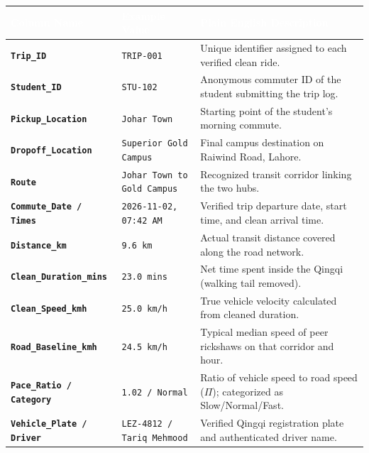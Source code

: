 \documentclass[10pt, a4paper]{article}
\begin{document}
\begin{table}[h!]
\centering
\fontsize{7.8pt}{9.8pt}\selectfont
\begin{tabularx}{\textwidth}{|>{\bfseries\color{navyblue}}p{3.6cm}|p{2.5cm}|X|}
\hline
\rowcolor{navyblue}\textcolor{white}{\textbf{Column Name}} & \textcolor{white}{\textbf{Example Value}} & \textcolor{white}{\textbf{Plain English Description}} \\ \hline
\rowcolor{white}\texttt{Trip\_ID} & \texttt{TRIP-001} & Unique identifier assigned to each verified clean ride. \\ \hline
\rowcolor{lightgray}\texttt{Student\_ID} & \texttt{STU-102} & Anonymous commuter ID of the student submitting the trip log. \\ \hline
\rowcolor{white}\texttt{Pickup\_Location} & \texttt{Johar Town} & Starting point of the student's morning commute. \\ \hline
\rowcolor{lightgray}\texttt{Dropoff\_Location} & \texttt{Superior Gold Campus} & Final campus destination on Raiwind Road, Lahore. \\ \hline
\rowcolor{white}\texttt{Route} & \texttt{Johar Town to Gold Campus} & Recognized transit corridor linking the two hubs. \\ \hline
\rowcolor{lightgray}\texttt{Commute\_Date / Times} & \texttt{2026-11-02, 07:42 AM} & Verified trip departure date, start time, and clean arrival time. \\ \hline
\rowcolor{white}\texttt{Distance\_km} & \texttt{9.6 km} & Actual transit distance covered along the road network. \\ \hline
\rowcolor{lightgray}\texttt{Clean\_Duration\_mins} & \texttt{23.0 mins} & Net time spent inside the Qingqi (walking tail removed). \\ \hline
\rowcolor{white}\texttt{Clean\_Speed\_kmh} & \texttt{25.0 km/h} & True vehicle velocity calculated from cleaned duration. \\ \hline
\rowcolor{lightgray}\texttt{Road\_Baseline\_kmh} & \texttt{24.5 km/h} & Typical median speed of peer rickshaws on that corridor and hour. \\ \hline
\rowcolor{white}\texttt{Pace\_Ratio / Category} & \texttt{1.02 / Normal} & Ratio of vehicle speed to road speed (\(\Pi\)); categorized as Slow/Normal/Fast. \\ \hline
\rowcolor{lightgray}\texttt{Vehicle\_Plate / Driver} & \texttt{LEZ-4812 / Tariq Mehmood} & Verified Qingqi registration plate and authenticated driver name. \\ \hline

\end{tabularx}
\end{table}
\end{document}
